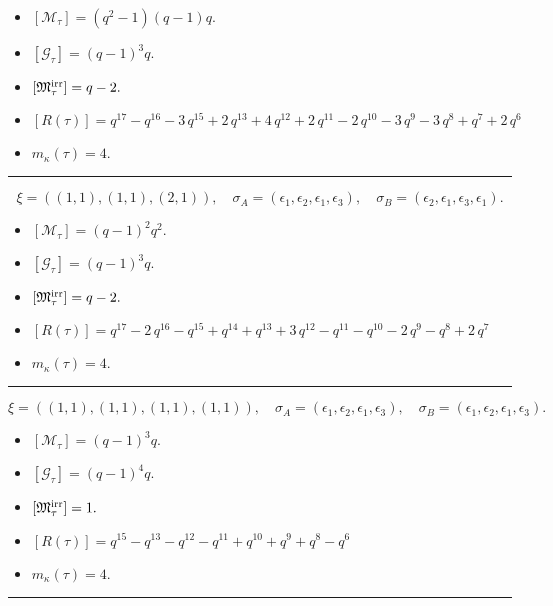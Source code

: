\documentclass[10pt,a4paper]{amsart}
\begin{document}
\begin{itemize}
 \item $[\mathcal{M}_{\tau}] = {\left(q^{2} - 1\right)} {\left(q - 1\right)} q .$

 \item $[\mathcal{G}_{\tau}] = {\left(q - 1\right)}^{3} q .$

 \item $[{\frak M}_{\tau}^{\textrm{irr}}] = q - 2 .$

 \item $[R(\tau)] = q^{17} - q^{16} - 3 \, q^{15} + 2 \, q^{13} + 4 \, q^{12} + 2 \, q^{11} - 2 \, q^{10} - 3 \, q^{9} - 3 \, q^{8} + q^{7} + 2 \, q^{6} $

 \item $m_{\kappa}(\tau) = 4 .$

 \end{itemize}
\noindent\rule{8cm}{0.4pt}

$$\xi = ({(1, 1)}, {(1, 1)}, {(2, 1)}),\quad \sigma_A = ({{\epsilon_1}}, {{\epsilon_2}}, {{\epsilon_1, \epsilon_3}}),\quad \sigma_B = ({{\epsilon_2}}, {{\epsilon_1}}, {{\epsilon_3, \epsilon_1}}).$$

\begin{itemize}
 \item $[\mathcal{M}_{\tau}] = {\left(q - 1\right)}^{2} q^{2} .$

 \item $[\mathcal{G}_{\tau}] = {\left(q - 1\right)}^{3} q .$

 \item $[{\frak M}_{\tau}^{\textrm{irr}}] = q - 2 .$

 \item $[R(\tau)] = q^{17} - 2 \, q^{16} - q^{15} + q^{14} + q^{13} + 3 \, q^{12} - q^{11} - q^{10} - 2 \, q^{9} - q^{8} + 2 \, q^{7} $

 \item $m_{\kappa}(\tau) = 4 .$

 \end{itemize}
\noindent\rule{8cm}{0.4pt}

$$\xi = ({(1, 1)}, {(1, 1)}, {(1, 1), (1, 1)}),\quad \sigma_A = ({{\epsilon_1}}, {{\epsilon_2}}, {{\epsilon_1}, {\epsilon_3}}),\quad \sigma_B = ({{\epsilon_1}}, {{\epsilon_2}}, {{\epsilon_1}, {\epsilon_3}}).$$

\begin{itemize}
 \item $[\mathcal{M}_{\tau}] = {\left(q - 1\right)}^{3} q .$

 \item $[\mathcal{G}_{\tau}] = {\left(q - 1\right)}^{4} q .$

 \item $[{\frak M}_{\tau}^{\textrm{irr}}] = 1 .$

 \item $[R(\tau)] = q^{15} - q^{13} - q^{12} - q^{11} + q^{10} + q^{9} + q^{8} - q^{6} $

 \item $m_{\kappa}(\tau) = 4 .$

 \end{itemize}
\noindent\rule{8cm}{0.4pt}
\end{document}
